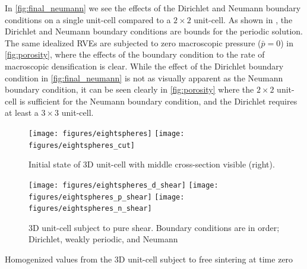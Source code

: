 \documentclass[12pt,a4paper]{article}
\begin{document}
In \cref{fig:final_neumann} we see the effects of the Dirichlet and Neumann boundary conditions on a single unit-cell compared to a $2\times 2$ unit-cell.
As shown in \cite{ohman_variationally_2014}, the Dirichlet and Neumann boundary conditions are bounds for the periodic solution.
The same idealized RVEs are subjected to zero macroscopic pressure ($\bar{p} = 0$) in \cref{fig:porosity}, where the effects of the boundary condition to the rate of macroscopic densification is clear.
While the effect of the Dirichlet boundary condition in \cref{fig:final_neumann} is not as visually apparent as the Neumann boundary condition, it can be seen clearly in \cref{fig:porosity} where the $2\times2$ unit-cell is sufficient for the Neumann boundary condition, and the Dirichlet requires at least a $3\times 3$ unit-cell.



\begin{figure}[hbp!]
 \centering
 \texttt{[image: figures/eightspheres]}
 \texttt{[image: figures/eightspheres\_cut]}
 \caption{Initial state of 3D unit-cell with middle cross-section visible (right).}
 \label{fig:rve_3d}
\end{figure}


\begin{figure}[htbp!]
 \centering
 \texttt{[image: figures/eightspheres\_d\_shear]}
 \texttt{[image: figures/eightspheres\_p\_shear]}
 \texttt{[image: figures/eightspheres\_n\_shear]}
 \caption{3D unit-cell subject to pure shear. Boundary conditions are in order; Dirichlet, weakly periodic, and Neumann}
 \label{fig:rve_3d_deformed}
\end{figure}

\begin{table}[htbp!]
 \centering



 \caption{Homogenized values from the 3D unit-cell subject to free sintering at time zero}
 \label{tab:rve_3d_homog}
\end{table}


\end{document}
